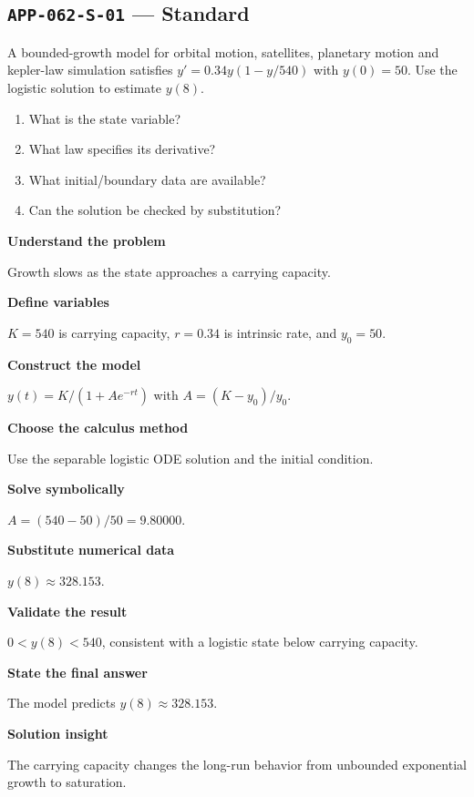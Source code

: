 \documentclass[11pt]{book}
\newcommand{\pid}[1]{\texttt{#1}}
\begin{document}
\subsection*{\pid{APP-062-S-01} — Standard}
\begin{problembox}
A bounded-growth model for orbital motion, satellites, planetary motion and kepler-law simulation satisfies $y'=0.34y(1-y/540)$ with $y(0)=50$. Use the logistic solution to estimate $y(8)$.
\end{problembox}
\begin{promptbox}\begin{enumerate}
\item What is the state variable?
\item What law specifies its derivative?
\item What initial/boundary data are available?
\item Can the solution be checked by substitution?
\end{enumerate}\end{promptbox}
\begin{solutionbox}
\textbf{Understand the problem}\par Growth slows as the state approaches a carrying capacity.\par\medskip
\textbf{Define variables}\par $K=540$ is carrying capacity, $r=0.34$ is intrinsic rate, and $y_0=50$.\par\medskip
\textbf{Construct the model}\par $y(t)=K/(1+A e^{-rt})$ with $A=(K-y_0)/y_0$.\par\medskip
\textbf{Choose the calculus method}\par Use the separable logistic ODE solution and the initial condition.\par\medskip
\textbf{Solve symbolically}\par $A=(540-50)/50=9.80000$.\par\medskip
\textbf{Substitute numerical data}\par $y(8)\approx 328.153$.\par\medskip
\textbf{Validate the result}\par $0<y(8)<540$, consistent with a logistic state below carrying capacity.\par\medskip
\textbf{State the final answer}\par The model predicts $y(8)\approx 328.153$.\par\medskip
\textbf{Solution insight}\par The carrying capacity changes the long-run behavior from unbounded exponential growth to saturation.\par\medskip
\end{solutionbox}
\end{document}

